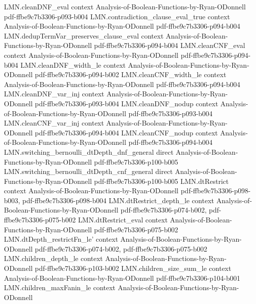 \begin{lemma}
\proofstep
  {LMN.cleanDNF_eval}
  {context}
  {Analysis-of-Boolean-Functions-by-Ryan-ODonnell}
  {pdf-ffbe9c7b3306-p093-b004}
\proofstep
  {LMN.contradiction_clause_eval_true}
  {context}
  {Analysis-of-Boolean-Functions-by-Ryan-ODonnell}
  {pdf-ffbe9c7b3306-p094-b004}
\proofstep
  {LMN.dedupTermVar_preserves_clause_eval}
  {context}
  {Analysis-of-Boolean-Functions-by-Ryan-ODonnell}
  {pdf-ffbe9c7b3306-p094-b004}
\proofstep
  {LMN.cleanCNF_eval}
  {context}
  {Analysis-of-Boolean-Functions-by-Ryan-ODonnell}
  {pdf-ffbe9c7b3306-p094-b004}
\proofstep
  {LMN.cleanDNF_width_le}
  {context}
  {Analysis-of-Boolean-Functions-by-Ryan-ODonnell}
  {pdf-ffbe9c7b3306-p094-b002}
\proofstep
  {LMN.cleanCNF_width_le}
  {context}
  {Analysis-of-Boolean-Functions-by-Ryan-ODonnell}
  {pdf-ffbe9c7b3306-p094-b004}
\proofstep
  {LMN.cleanDNF_var_inj}
  {context}
  {Analysis-of-Boolean-Functions-by-Ryan-ODonnell}
  {pdf-ffbe9c7b3306-p093-b004}
\proofstep
  {LMN.cleanDNF_nodup}
  {context}
  {Analysis-of-Boolean-Functions-by-Ryan-ODonnell}
  {pdf-ffbe9c7b3306-p093-b004}
\proofstep
  {LMN.cleanCNF_var_inj}
  {context}
  {Analysis-of-Boolean-Functions-by-Ryan-ODonnell}
  {pdf-ffbe9c7b3306-p094-b004}
\proofstep
  {LMN.cleanCNF_nodup}
  {context}
  {Analysis-of-Boolean-Functions-by-Ryan-ODonnell}
  {pdf-ffbe9c7b3306-p094-b004}
\proofstep
  {LMN.switching_bernoulli_dtDepth_dnf_general}
  {direct}
  {Analysis-of-Boolean-Functions-by-Ryan-ODonnell}
  {pdf-ffbe9c7b3306-p100-b005}
\proofstep
  {LMN.switching_bernoulli_dtDepth_cnf_general}
  {direct}
  {Analysis-of-Boolean-Functions-by-Ryan-ODonnell}
  {pdf-ffbe9c7b3306-p100-b005}
\proofstep
  {LMN.dtRestrict}
  {context}
  {Analysis-of-Boolean-Functions-by-Ryan-ODonnell}
  {pdf-ffbe9c7b3306-p098-b003,
    pdf-ffbe9c7b3306-p098-b004}
\proofstep
  {LMN.dtRestrict_depth_le}
  {context}
  {Analysis-of-Boolean-Functions-by-Ryan-ODonnell}
  {pdf-ffbe9c7b3306-p074-b002,
    pdf-ffbe9c7b3306-p075-b002}
\proofstep
  {LMN.dtRestrict_eval}
  {context}
  {Analysis-of-Boolean-Functions-by-Ryan-ODonnell}
  {pdf-ffbe9c7b3306-p075-b002}
\proofstep
  {LMN.dtDepth_restrictFn_le'}
  {context}
  {Analysis-of-Boolean-Functions-by-Ryan-ODonnell}
  {pdf-ffbe9c7b3306-p074-b002,
    pdf-ffbe9c7b3306-p075-b002}
\proofstep
  {LMN.children_depth_le}
  {context}
  {Analysis-of-Boolean-Functions-by-Ryan-ODonnell}
  {pdf-ffbe9c7b3306-p103-b002}
\proofstep
  {LMN.children_size_sum_le}
  {context}
  {Analysis-of-Boolean-Functions-by-Ryan-ODonnell}
  {pdf-ffbe9c7b3306-p104-b001}
\proofstep
  {LMN.children_maxFanin_le}
  {context}
  {Analysis-of-Boolean-Functions-by-Ryan-ODonnell}

\end{lemma}
